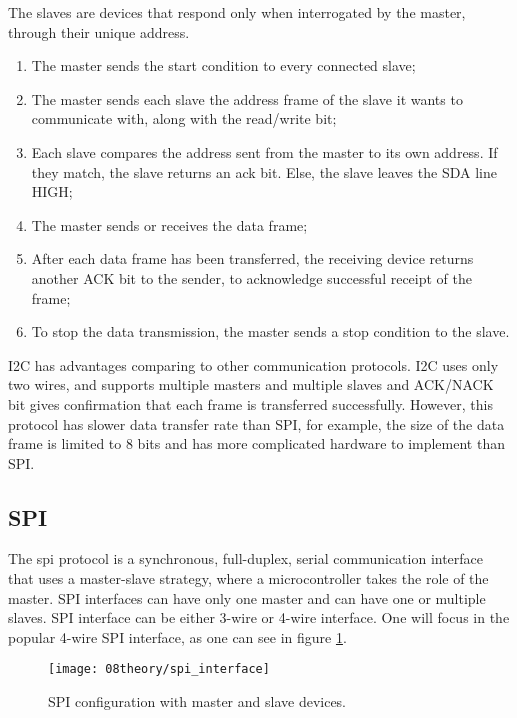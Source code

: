 The slaves are devices that respond only when interrogated by the master, through their unique address.
\begin{enumerate}
	\item The master sends the start condition to every connected slave;
	\item The master sends each slave the address frame of the slave it wants to communicate with, along with the read/write bit;
	\item Each slave compares the address sent from the master to its own address. If they match, the slave returns an \ac{ack} bit. Else, the slave leaves the SDA line HIGH;
	\item The master sends or receives the data frame;
	\item After each data frame has been transferred, the receiving device returns another ACK bit to the sender, to acknowledge successful receipt of the frame;
	\item To stop the data transmission, the master sends a stop condition to the slave.
\end{enumerate}

I2C has advantages comparing to other communication protocols. I2C uses only two wires, and supports multiple masters and multiple slaves and ACK/NACK bit gives confirmation that each frame is transferred successfully. However, this protocol has slower data transfer rate than SPI, for example, the size of the data frame is limited to 8 bits and has more complicated hardware to implement than SPI.

\clearpage
\subsection{SPI}
The \ac{spi} protocol is a synchronous, full-duplex, serial communication interface that uses a master-slave strategy, where a microcontroller takes the role of the master. SPI interfaces can have only one master and can have one or multiple slaves. SPI interface can be either 3-wire or 4-wire interface. One will focus in the popular 4-wire SPI interface, as one can see in figure \ref{fig:spi_interface}. \cite{spi_interface}

\begin{figure}[H]
	\centering
	\texttt{[image: 08theory/spi\_interface]}
	\caption{SPI configuration with master and slave devices.}
	\label{fig:spi_interface}
\end{figure}

